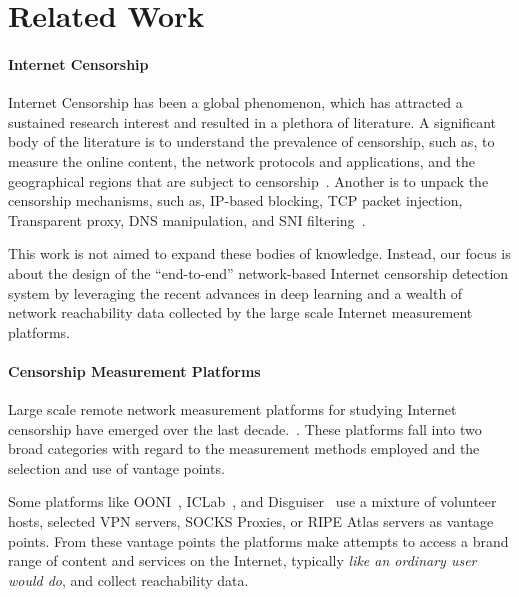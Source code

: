 \section{Related Work}
\label{sec:related}

\paragraph{Internet Censorship} 
Internet Censorship has been a global phenomenon, which has attracted a
sustained research interest and resulted in a plethora of literature.  
%
A significant body of the literature is to understand the prevalence of
censorship, such as, to measure the online content, the network protocols and
applications, and the geographical regions that are subject to
censorship~\cite{aryan2013internet, nabi2013anatomy, singh2017characterizing,
yadav2018light, ng2018detecting,
meserve2018google, bock2021even, padmanabhan2021multi, ververis2021understanding}.  
%
Another is to unpack the censorship mechanisms, such as,
IP-based blocking, TCP packet injection, Transparent proxy,  DNS manipulation,
and SNI filtering~\cite{aceto_internet_2015, chai2019importance, bock2021even,
niaki2020iclab}.  

This work is not aimed to expand these bodies of knowledge.  Instead, our focus
is about the design of the ``end-to-end'' network-based Internet censorship
detection system by leveraging the recent advances in deep learning and a wealth
of network reachability data collected by the large scale Internet measurement
platforms. 


\paragraph{Censorship Measurement Platforms}
Large scale remote network measurement
platforms for studying Internet censorship have emerged over the last decade.~\cite{niaki2020iclab,
filasto2012ooni, sundara_raman_censored_2020, pearce2017augur,
pearce2017global, scott2016satellite, vandersloot2018quack, raman_measuring_2020,
jin2021understanding}. These platforms fall into two broad categories with regard to the measurement
methods employed and the selection and use of vantage points.

Some platforms
like OONI~\cite{filasto2012ooni}, ICLab~\cite{niaki2020iclab}, and
Disguiser~\cite{jin2021understanding} use a mixture of volunteer hosts, 
selected VPN servers, SOCKS Proxies, or RIPE Atlas servers as vantage 
points. From these vantage points the platforms make attempts to access a brand range
of content and services on the Internet, typically {\em like an
ordinary user would do}, and collect reachability data.  

